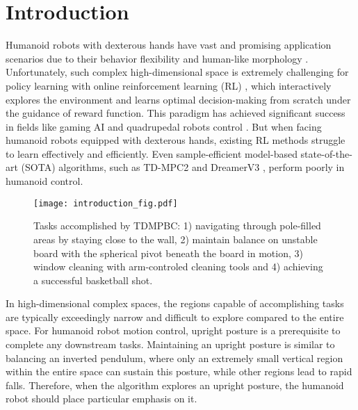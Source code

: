 \section{Introduction}
Humanoid robots with dexterous hands have vast and promising application scenarios due to their behavior flexibility and human-like morphology \citep{bonci2021human, stasse2019overview, choudhury2018humanoid}.
Unfortunately, such complex high-dimensional space is extremely challenging for policy learning with online reinforcement learning (RL) \citep{sferrazza2024humanoidbench, peters2003reinforcement}, which interactively explores the environment and learns optimal decision-making from scratch under the guidance of reward function.
This paradigm has achieved significant success in fields like gaming AI \citep{silver2016mastering, silver2017mastering, schrittwieser2020mastering, hessel2018rainbow} and quadrupedal robots control \citep{miki2022learning, lee2020learning, hwangbo2019learning}.
But when facing humanoid robots equipped with dexterous hands, existing RL methods struggle to learn effectively and efficiently. 
Even sample-efficient model-based state-of-the-art (SOTA) algorithms, such as TD-MPC2 \citep{hansen2023td} and DreamerV3 \citep{hafner2023mastering}, perform poorly in humanoid control.

\begin{figure}[t]
    \centering
    \vspace{4pt}
    \texttt{[image: introduction\_fig.pdf]}
    \caption{Tasks accomplished by TDMPBC: 1) navigating through pole-filled areas by staying close to the wall, 2) maintain balance on unstable board with the spherical pivot beneath the board in motion, 3) window cleaning with arm-controled cleaning tools and 4) achieving a successful basketball shot.}
    \label{fig:main}
    \vspace{-16pt}
\end{figure}

In high-dimensional complex spaces, the regions capable of accomplishing tasks are typically exceedingly narrow and difficult to explore compared to the entire space. 
For humanoid robot motion control, upright posture is a prerequisite to complete any downstream tasks.
Maintaining an upright posture is similar to balancing an inverted pendulum, where only an extremely small vertical region within the entire space can sustain this posture, while other regions lead to rapid falls.
Therefore, when the algorithm explores an upright posture, the humanoid robot should place particular emphasis on it.

